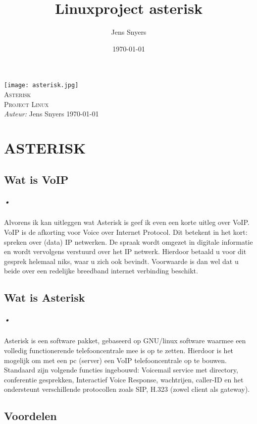 \documentclass[12pt,a4paper]{report}
\title{Linuxproject asterisk}
\author{Jens Snyers}
\date{\today}
\begin{document}
\begin{titlepage}
\begin{center}
\texttt{[image: asterisk.jpg]} \\
\textsc{\LARGE Asterisk}\\[1.5cm]
\textsc{\Large Project Linux}\\[0.5cm]
\emph{Auteur:} Jens Snyers
\vfill
{\large \today}
\end{center}
\end{titlepage}

\tableofcontents

\chapter{ASTERISK ~\cite{ASTERISK}}
\section{Wat is VoIP}
\paragraph{•}
Alvorens ik kan uitleggen wat Asterisk is geef ik even een korte uitleg over VoIP. VoIP is de afkorting voor Voice over Internet Protocol. Dit betekent in het kort: spreken over (data) IP netwerken. De spraak wordt omgezet in digitale informatie en wordt vervolgens verstuurd over het IP netwerk. Hierdoor betaald u voor dit gesprek helemaal niks, waar u zich ook bevindt. Voorwaarde is dan wel dat u beide over een redelijke breedband internet verbinding beschikt. 

\section{Wat is Asterisk}
\paragraph{•}
Asterisk is een software pakket, gebaseerd op GNU/linux software waarmee een volledig functionerende telefooncentrale mee is op te zetten. Hierdoor is het mogelijk om met een pc (server) een VoIP telefooncentrale op te bouwen. Standaard zijn volgende functies ingebouwd: Voicemail service met directory, conferentie gesprekken, Interactief Voice Response, wachtrijen, caller-ID en het ondersteunt verschillende protocollen zoals SIP, H.323 (zowel client als gateway).

\section{Voordelen}
\end{document}
